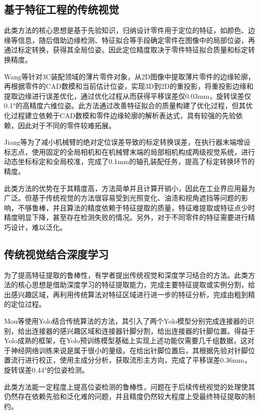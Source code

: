 \documentclass{Diploma}
\begin{document}
\subsection{基于特征工程的传统视觉}
此类方法的核心思想是基于先验知识，归纳设计零件用于定位的特征，如颜色、边缘等信息，随后借助边缘检测、特征拟合等手段确定零件在图像中的局部位姿，再通过标定转换，获得其全局位姿。因此定位精度取决于零件特征拟合质量和标定转换精度。

Wang等针对3C装配领域的薄片零件对象，从2D图像中提取薄片零件的边缘轮廓，再根据零件的CAD数模和当前估计位姿，实现3D到2D的重投影，将重投影边缘和提取边缘进行误差优化，通过优化过程从而获得平移误差仅0.03mm，旋转误差仅0.1°的高精度六维位姿。此方法通过改善特征拟合的质量构建了优化过程，但其优化过程建立依赖于CAD数模和零件边缘轮廓的解析表达式，具有较强的先验依赖，因此对于不同的零件较难拓展\cite{wang2025high}。
%

Jiang等为了减小机械臂的绝对定位误差导致的标定转换误差，在执行器末端增设标志点，使用固定的全局相机和在机械臂末端的局部相机构成两级视觉系统，进行动态坐标标定和全局校准，完成了0.1mm的轴孔装配任务，提高了标定转换环节的精度\cite{jiang2020measurement}。

此类方法的优势在于其精度高，方法简单并且计算开销小，因此在工业界应用最为广泛。但基于传统视觉的方法很容易受到光照变化、油渍和视角遮挡等问题的影响，不够鲁棒，并且算法的精度依赖于特征提取的质量，特征难提取或特征点少时精度明显下降，甚至存在检测失败的情况。另外，对于不同零件的特征需要进行精巧设计，难以泛化。
\subsection{传统视觉结合深度学习}
为了提高特征提取的鲁棒性，有学者提出传统视觉和深度学习结合的方法。此类方法的核心思想是借助深度学习的特征提取能力，完成主要特征提取或实例分割，给出感兴趣区域，再利用传统算法对特征区域进行进一步的特征分析，完成由粗到精的定位过程。

Mou等使用Yolo结合传统算法的方法，其引入了两个Yolo模型分别完成连接器的识别，给出连接器的感兴趣区域和连接器针脚分割，给出连接器的针脚位置。得益于Yolo成熟的框架，在Yolo预训练模型基础上实现上述功能仅需要几千组数据，这对于神经网络训练来说是属于很小的量级。在给出针脚位置后，其根据先验对针脚位置流行进行校正，使用主成分分析，获取流形主方向，完成了平移误差0.36mm，旋转误差0.44°的位姿检测\cite{fangli2022pose}。
%

此类方法能一定程度上提高位姿检测的鲁棒性，问题在于后续传统视觉的处理使其仍然存在依赖先验和泛化难的问题，并且精度仍然较大程度上受最终特征提取的制约。
\end{document}
